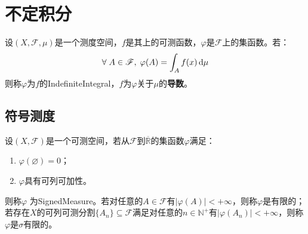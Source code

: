 \section{不定积分}

\begin{definition}
	设$(X,\mathscr{F},\mu)$是一个测度空间，$f$是其上的可测函数，$\varphi$是$\mathscr{F}$上的集函数。若：
	\begin{equation*}
		\forall\;A\in\mathscr{F},\;\varphi(A)=\int_{A}f(x)\mathop{}\!\mathrm{d}\mu
	\end{equation*}
	则称$\varphi$为$f$的\gls{IndefiniteIntegral}，$f$为$\varphi$关于$\mu$的\textbf{导数}。
\end{definition}

\subsection{符号测度}
\begin{definition}
	设$(X,\mathscr{F})$是一个可测空间，若从$\mathscr{F}$到$\overline{\mathbb{R}}$的集函数$\varphi$满足：
	\begin{enumerate}
		\item $\varphi(\varnothing)=0$；
		\item $\varphi$具有可列可加性。
	\end{enumerate}
	则称$\varphi$	为\gls{SignedMeasure}。若对任意的$A\in\mathscr{F}$有$|\varphi(A)|<+\infty$，则称$\varphi$是有限的；若存在$X$的可列可测分割$\{A_n\}\subseteq\mathscr{F}$满足对任意的$n\in\mathbb{N}^+$有$|\varphi(A_n)|<+\infty$，则称$\varphi$是$\sigma$有限的。
\end{definition}
